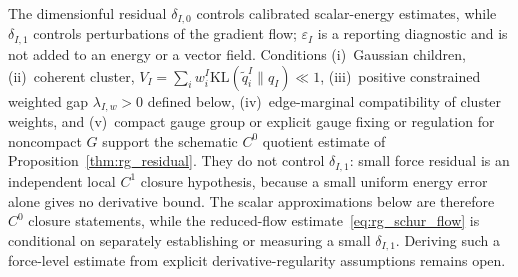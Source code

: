 \documentclass[11pt]{article}
\begin{document}
The dimensionful residual $\delta_{I,0}$ controls calibrated scalar-energy estimates, while $\delta_{I,1}$ controls perturbations of the gradient flow; $\varepsilon_I$ is a reporting diagnostic and is not added to an energy or a vector field. Conditions (i)~Gaussian children, (ii)~coherent cluster, $V_I = \sum_i w_i^I \mathrm{KL}(\widetilde{q}_i^I \| q_I) \ll 1$, (iii)~positive constrained weighted gap $\lambda_{I,w} > 0$ defined below, (iv)~edge-marginal compatibility of cluster weights, and (v)~compact gauge group or explicit gauge fixing or regulation for noncompact $G$ support the schematic $C^0$ quotient estimate of Proposition~\ref{thm:rg_residual}. They do not control $\delta_{I,1}$: small force residual is an independent local $C^1$ closure hypothesis, because a small uniform energy error alone gives no derivative bound. The scalar approximations below are therefore $C^0$ closure statements, while the reduced-flow estimate~\eqref{eq:rg_schur_flow} is conditional on separately establishing or measuring a small $\delta_{I,1}$. Deriving such a force-level estimate from explicit derivative-regularity assumptions remains open.
\end{document}
